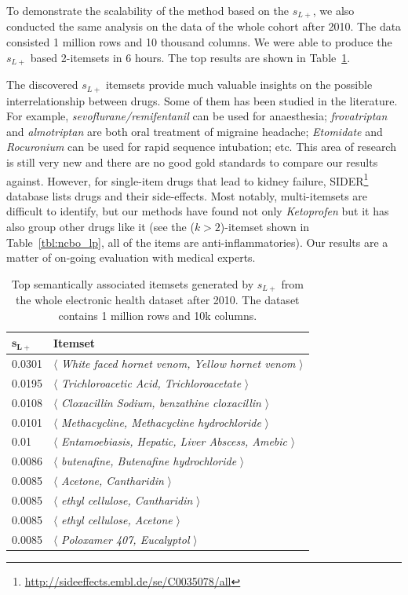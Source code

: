 To demonstrate the scalability of the method based on the $s_{L+}$, we also conducted the same analysis on the data of the whole cohort after 2010. The data consisted 1 million rows and 10 thousand columns. We were able to produce the $s_{L+}$ based 2-itemsets in 6 hours. The top results are shown in Table~\ref{tbl:ncbo_lp_whole}.

The discovered $s_{L+}$ itemsets provide much valuable insights on the possible interrelationship between drugs. Some of them has been studied in the literature. For example, \emph{sevoflurane/remifentanil} can be used for anaesthesia; \emph{frovatriptan} and \emph{almotriptan} are both oral treatment of migraine headache; \emph{Etomidate} and \emph{Rocuronium} can be used for rapid sequence intubation; etc. This area of research is still very new and there are no good gold standards to compare our results against.  However, for single-item drugs that lead to kidney failure, SIDER\footnote{\url{http://sideeffects.embl.de/se/C0035078/all}} database lists drugs and their side-effects.  Most notably, multi-itemsets are difficult to identify, but our methods have found not only \emph{Ketoprofen} but it has also group other drugs like it (see the ($k>2$)-itemset shown in Table~\ref{tbl:ncbo_lp}, all of the items are anti-inflammatories). Our results are a matter of on-going evaluation with medical experts.


\begin{table}
\begin{center}
\begin{tabular}{l | l }
  \hline
$\mathbf{s_{L+}}$      &   \textbf{Itemset}\\
  \hline\hline
0.0301	&$\langle$\emph{	White faced hornet venom, Yellow hornet venom		}$\rangle$\\
0.0195	&$\langle$\emph{	Trichloroacetic Acid, Trichloroacetate		}$\rangle$\\
0.0108	&$\langle$\emph{	Cloxacillin Sodium, benzathine cloxacillin		}$\rangle$\\
0.0101	&$\langle$\emph{	Methacycline, Methacycline hydrochloride		}$\rangle$\\
0.01	&$\langle$\emph{	Entamoebiasis, Hepatic, Liver Abscess, Amebic		}$\rangle$\\
0.0086	&$\langle$\emph{	butenafine, Butenafine hydrochloride		}$\rangle$\\
0.0085	&$\langle$\emph{	Acetone, Cantharidin		}$\rangle$\\
0.0085	&$\langle$\emph{	ethyl cellulose, Cantharidin		}$\rangle$\\
0.0085	&$\langle$\emph{	ethyl cellulose, Acetone		}$\rangle$\\
0.0085	&$\langle$\emph{	Poloxamer 407, Eucalyptol		}$\rangle$\\
  \hline
\end{tabular}
\end{center}
\caption{\label{tbl:ncbo_lp_whole} Top semantically associated itemsets generated by $s_{L+}$ from the whole electronic health dataset after 2010. The dataset contains 1 million rows and 10k columns.}
\end{table}

